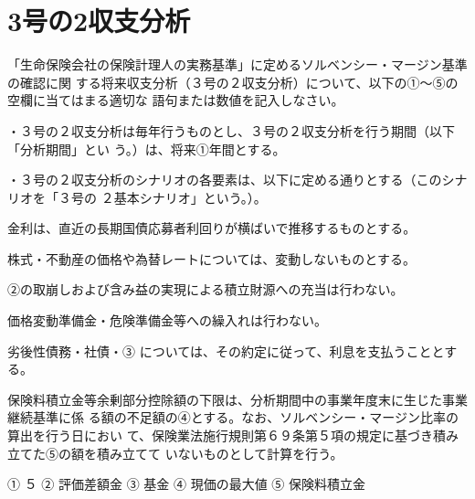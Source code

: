 \documentclass[report,gutter=10mm,fore-edge=10mm,uplatex,dvipdfmx]{jlreq}
\begin{document}
\section{3号の2収支分析}
「生命保険会社の保険計理人の実務基準」に定めるソルベンシー・マージン基準の確認に関
する将来収支分析（３号の２収支分析）について、以下の①～⑤の空欄に当てはまる適切な
語句または数値を記入しなさい。

・３号の２収支分析は毎年行うものとし、３号の２収支分析を行う期間（以下「分析期間」とい
う。）は、将来①年間とする。

・３号の２収支分析のシナリオの各要素は、以下に定める通りとする（このシナリオを「３号の
２基本シナリオ」という。）。

 金利は、直近の長期国債応募者利回りが横ばいで推移するものとする。

 株式・不動産の価格や為替レートについては、変動しないものとする。

②の取崩しおよび含み益の実現による積立財源への充当は行わない。

 価格変動準備金・危険準備金等への繰入れは行わない。

 劣後性債務・社債・③
については、その約定に従って、利息を支払うこととする。

保険料積立金等余剰部分控除額の下限は、分析期間中の事業年度末に生じた事業継続基準に係
る額の不足額の④とする。なお、ソルベンシー・マージン比率の算出を行う日におい
て、保険業法施行規則第６９条第５項の規定に基づき積み立てた⑤の額を積み立てて
いないものとして計算を行う。

\answer{}
① ５ ② 評価差額金 
③ 基金 
④ 現価の最大値 ⑤ 保険料積立金 
\end{document}
